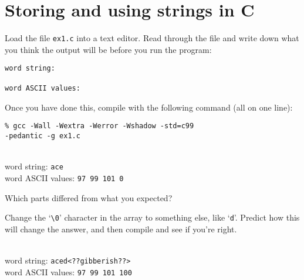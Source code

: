 \bgroup

\section*{Storing and using strings in C}

Load the file \lstinline'ex1.c' into a text editor. Read through the file and write down what you think the output will be before you run the program:

\lstinline[language={[coin]C}]'word string: '

\lstinline[language={[coin]C}]'word ASCII values: '%
~~~~~~

Once you have done this, compile with the following command (all on one line):

\texttt{\% gcc -Wall -Wextra -Werror -Wshadow -std=c99}\\
\hspace*{0.5in} \texttt{-pedantic -g ex1.c}

\begin{solution}\\
word string: \texttt{ace}\\
word ASCII values: \texttt{97 99 101 0}
\end{solution}

\begin{part}
  Which parts differed from what you expected?

\end{part}

\begin{part}
  Change the `\texttt{\textbackslash0}' character in the array to
  something else, like `\texttt{d}'. Predict how this will change the
  answer, and then compile and see if you're right.

\begin{solution}\\
word string: \texttt{aced<??gibberish??>}\\
word ASCII values: \texttt{97 99 101 100}
\end{solution}
\end{part}

